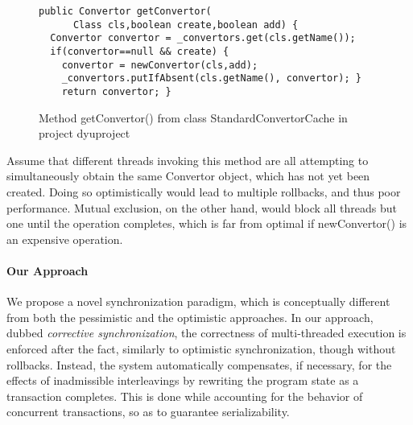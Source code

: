 \begin{figure}
	\begin{lstlisting}
public Convertor getConvertor(
      Class cls,boolean create,boolean add) {
  Convertor convertor = _convertors.get(cls.getName());
  if(convertor==null && create) {
    convertor = newConvertor(cls,add);
    _convertors.putIfAbsent(cls.getName(), convertor); }
    return convertor; }
	\end{lstlisting}
	\caption{\label{Fi:introMotivating}Method {\sf getConvertor()} from class {\sf StandardConvertorCache} in project {\sf dyuproject}}
\end{figure}

Assume that different threads invoking this method are all attempting to simultaneously obtain the same {\sf Convertor} object, which has not yet been created. Doing so optimistically would lead to multiple rollbacks, and thus poor performance. Mutual exclusion, on the other hand, would block all threads but one until the operation completes, which is far from optimal if {\sf newConvertor()} is an expensive operation.

\paragraph{Our Approach} We propose a novel synchronization paradigm, which is conceptually different from both the pessimistic and the optimistic approaches. In our approach, dubbed \emph{corrective synchronization}, the correctness of multi-threaded execution is enforced after the fact, similarly to optimistic synchronization, though without rollbacks. Instead, the system automatically compensates, if necessary, for the effects of inadmissible interleavings by rewriting the program state as a transaction completes. This is done while accounting for the behavior of concurrent transactions, so as to guarantee serializability.

